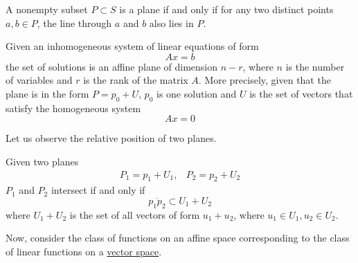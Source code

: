   \begin{theorem}
    \label{thm:characterization-of-planes-by-lines}
    A nonempty subset $P \subset S$ is a plane if and only if for any two distinct points $a, b \in P$, the line through $a$ and $b$ also lies in $P$. 
  \end{theorem}

  \begin{theorem}
    \label{thm:solution-set-of-an-inhomogeneous-linear-system}
    Given an inhomogeneous system of linear equations of form 
    \begin{equation}
      A x = b
    \end{equation}
    the set of solutions is an affine plane of dimension $n-r$, where $n$ is the number of variables and $r$ is the rank of the matrix $A$. More precisely, given that the plane is in the form $P = p_0 + U$, $p_0$ is one solution and $U$ is the set of vectors that satisfy the homogeneous system
    \begin{equation}
      Ax = 0
    \end{equation}
  \end{theorem}

  Let us observe the relative position of two planes. 

  \begin{theorem}
    \label{thm:intersection-criterion-for-two-planes}
    Given two planes 
    \begin{align*}
      P_1 = p_1 + U_1, & P_2 = p_2 + U_2
    \end{align*}
    $P_1$ and $P_2$ intersect if and only if 
    \begin{equation}
      \overline{p_1 p_2} \subset U_1 + U_2
    \end{equation}
    where $U_1 + U_2$ is the set of all vectors of form $u_1 + u_2$, where $u_1 \in U_1, u_2 \in U_2$. 
  \end{theorem}

  Now, consider the class of functions on an affine space corresponding to the class of linear functions on a \hyperref[def:vector-space]{vector space}. 

